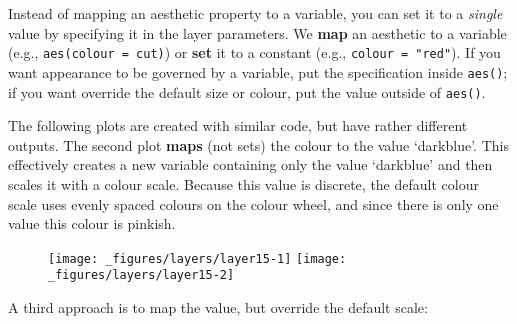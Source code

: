
Instead of mapping an aesthetic property to a variable, you can set it
to a \emph{single} value by specifying it in the layer parameters. We
\textbf{map} an aesthetic to a variable (e.g.,
\texttt{aes(colour\ =\ cut)}) or \textbf{set} it to a constant (e.g.,
\texttt{colour\ =\ "red"}). If you want appearance to be governed by a
variable, put the specification inside \texttt{aes()}; if you want
override the default size or colour, put the value outside of
\texttt{aes()}. 

The following plots are created with similar code, but have rather
different outputs. The second plot \textbf{maps} (not sets) the colour
to the value `darkblue'. This effectively creates a new variable
containing only the value `darkblue' and then scales it with a colour
scale. Because this value is discrete, the default colour scale uses
evenly spaced colours on the colour wheel, and since there is only one
value this colour is pinkish.

\begin{Shaded}
\begin{Highlighting}[]
\StringTok{ }
\StringTok{  }\NormalTok{(} \NormalTok{) }

\StringTok{ }
\StringTok{  }\NormalTok{(}\NormalTok{(} \NormalTok{))}
\end{Highlighting}
\end{Shaded}

\begin{figure}[H]
  \texttt{[image: \_figures/layers/layer15-1]}%
  \texttt{[image: \_figures/layers/layer15-2]}
\end{figure}

A third approach is to map the value, but override the default scale:

\begin{Shaded}
\begin{Highlighting}[]
\StringTok{ }
\StringTok{  }\NormalTok{(}\NormalTok{(} \NormalTok{)) +}\StringTok{ }
\StringTok{  }\NormalTok{()}
\end{Highlighting}
\end{Shaded}

